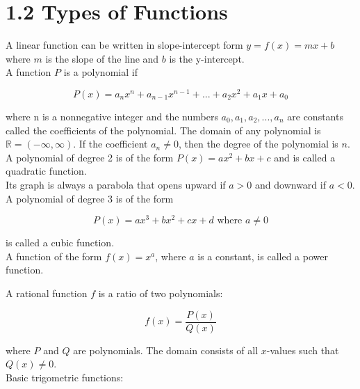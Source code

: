 %
%

\section*{1.2 Types of Functions}

A linear function can be written in slope-intercept form \(y=f(x)=mx+b\) where \(m\) is the slope of the line and \(b\) is the y-intercept.\\

A function \(P\) is a polynomial if 

$$P(x)=a_nx^n+a_{n-1}x^{n-1}+...+a_2x^2+a_1x+a_0$$

where n is a nonnegative integer and the numbers \(a_0, a_1, a_2,...,a_n\) are constants called the coefficients of the polynomial. The domain of any polynomial is \(\mathbb{R} = (-\infty, \infty)\). If the coefficient \(a_n \neq 0\), then the degree of the polynomial is \(n\).\\

A polynomial of degree 2 is of the form \(P(x)=ax^2+bx+c\) and is called a quadratic function.\\ Its graph is always a parabola that opens upward if \(a > 0\) and downward if \(a < 0\).\\

A polynomial of degree 3 is of the form 

\[ P(x)=ax^3+bx^2+cx+d \text{ where } a \neq 0 \]

is called a cubic function.\\

A function of the form \(f(x) = x^a\), where \(a\) is a constant, is called a power function.

A rational function \(f\) is a ratio of two polynomials:

\[ f(x)=\frac{P(x)}{Q(x)} \]

where \(P\) and \(Q\) are polynomials. The domain consists of all \(x\)-values such that \( Q(x) \neq 0 \).\\

Basic trigometric functions:\\

\begin{center}
\end{center}

